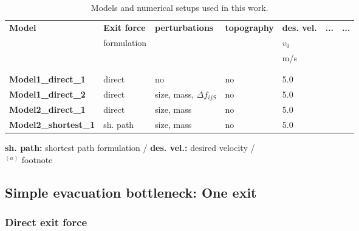 \documentclass[11pt]{article}
\begin{document}

\begin{landscape}
\begin{table}  
	 \begin{footnotesize}
	\caption{Models and numerical setups used in this work.}
	\label{tab:Parameters}
	\begin{tabular}{p{2.9cm} p{2.0cm} p{2.5cm} p{2.0cm} p{2.0cm} p{2.0cm} p{2.0cm} }
	\hline
	 \textbf{Model} & \textbf{Exit force} & \textbf{perturbations} & \textbf{topography} & \textbf{des. vel.} & \textbf{...} & \textbf{...}\\
	 & formulation & & & $v_{0}$    \\
	 & & & & m/s &   \\
	\hline
		&  \\
			&   \\
	\hline
	{\bf Model1\_direct\_1}	& direct 	& no			& no	& 5.0 & 			\\
	{\bf Model1\_direct\_2}	& direct 	& size, mass, $\Delta f_{ijS}$ 	& no 	& 5.0 &		\\
	{\bf Model2\_direct\_1}	& direct 	& size, mass 	& no 	& 5.0	 &				\\
	{\bf Model2\_shortest\_1}	& sh. path & size, mass 	& no 	& 5.0	 &			\\
	\hline
	\end{tabular}
	
	{\bf sh. path:} shortest path formulation / {\bf des. vel.:} desired velocity /    \\
	$^{(a)}$ footnote
	\end{footnotesize}
\end{table}
\end{landscape}



\subsection{Simple evacuation bottleneck: One exit}

\subsubsection{Direct exit force}
\end{document}
